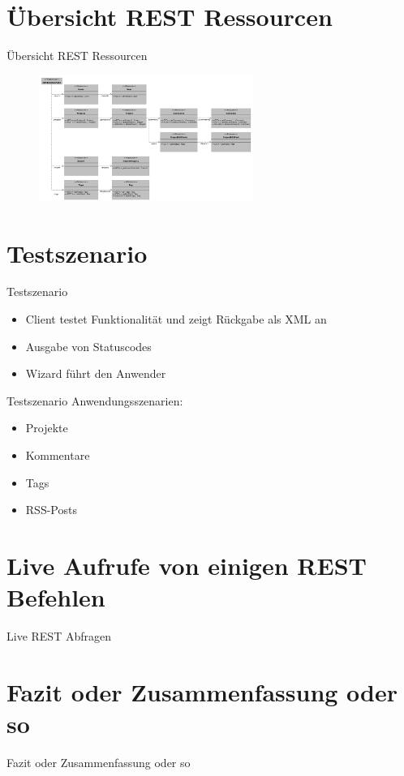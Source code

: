 \documentclass{beamer}
\begin{document}
	\section{Übersicht REST Ressourcen}
		\begin{frame}{Übersicht REST Ressourcen}
			\begin{figure}
				\centering
				\includegraphics[height=156]{Bilder/rest.pdf} 
				\label{fig:rest}
			\end{figure}	
		\end{frame}
	\section{Testszenario}
		\begin{frame}{Testszenario}
			\begin{itemize}
				\item Client testet Funktionalität und zeigt Rückgabe als XML an
				\item Ausgabe von Statuscodes
				\item Wizard führt den Anwender
			\end{itemize}
		
		\end{frame}
		\begin{frame}{Testszenario}
		Anwendungsszenarien:
			\begin{itemize}
				\item Projekte
				\item Kommentare
				\item Tags
				\item RSS-Posts
			\end{itemize}
				
		\end{frame}
		
	\section{Live Aufrufe von einigen REST Befehlen}
		\begin{frame}{Live REST Abfragen}
			
		\end{frame}
		
	\section{Fazit oder Zusammenfassung oder so}
		\begin{frame}{Fazit oder Zusammenfassung oder so}
			
		\end{frame}
	
	
\end{document}

